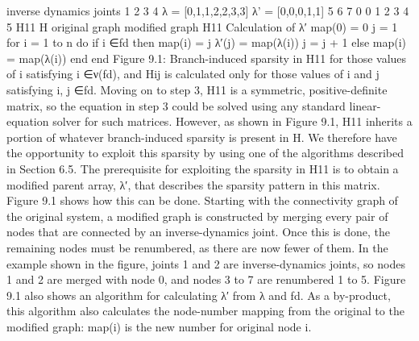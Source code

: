 inverse dynamics joints 1 2 3 4 λ = [0,1,1,2,2,3,3] λ’ = [0,0,0,1,1] 5 6 7 0 0 1 2 3 4 5 H11 H original graph modified graph H11 Calculation of λ′ map(0) = 0 j = 1 for i = 1 to n do if i ∈fd then map(i) = j λ′(j) = map(λ(i)) j = j + 1 else map(i) = map(λ(i)) end end Figure 9.1: Branch-induced sparsity in H11 for those values of i satisfying i ∈ν(fd), and Hij is calculated only for those values of i and j satisfying i, j ∈fd. Moving on to step 3, H11 is a symmetric, positive-definite matrix, so the equation in step 3 could be solved using any standard linear-equation solver for such matrices. However, as shown in Figure 9.1, H11 inherits a portion of whatever branch-induced sparsity is present in H. We therefore have the opportunity to exploit this sparsity by using one of the algorithms described in Section 6.5. The prerequisite for exploiting the sparsity in H11 is to obtain a modified parent array, λ′, that describes the sparsity pattern in this matrix. Figure 9.1 shows how this can be done. Starting with the connectivity graph of the original system, a modified graph is constructed by merging every pair of nodes that are connected by an inverse-dynamics joint. Once this is done, the remaining nodes must be renumbered, as there are now fewer of them. In the example shown in the figure, joints 1 and 2 are inverse-dynamics joints, so nodes 1 and 2 are merged with node 0, and nodes 3 to 7 are renumbered 1 to 5. Figure 9.1 also shows an algorithm for calculating λ′ from λ and fd. As a by-product, this algorithm also calculates the node-number mapping from the original to the modified graph: map(i) is the new number for original node i.

